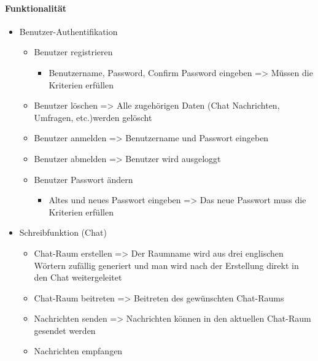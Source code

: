 \paragraph{Funktionalität}
\begin{itemize}
  \item Benutzer-Authentifikation
  \begin{itemize}
    \item Benutzer registrieren
    \begin{itemize}
      \item Benutzername, Password, Confirm Password eingeben
      \newline 
      => Müssen die Kriterien erfüllen
    \end{itemize}
    \item Benutzer löschen
    \newline
    => Alle zugehörigen Daten (Chat Nachrichten, Umfragen, etc.)werden gelöscht
    \item Benutzer anmelden
    \newline
    => Benutzername und Passwort eingeben
    \item Benutzer abmelden
    \newline
    => Benutzer wird ausgeloggt
    \item Benutzer Passwort ändern
    \begin{itemize}
      \item Altes und neues Passwort eingeben
      \newline
      => Das neue Passwort muss die Kriterien erfüllen
    \end{itemize}
  \end{itemize}
  \item Schreibfunktion (Chat)
    \begin{itemize}
      \item Chat-Raum erstellen
      \newline
      => Der Raumname wird aus drei englischen Wörtern zufällig generiert und man wird nach der Erstellung direkt in den Chat weitergeleitet
      \item Chat-Raum beitreten
      \newline
      => Beitreten des gewünschten Chat-Raums
      \item Nachrichten senden
      \newline
      => Nachrichten können in den aktuellen Chat-Raum gesendet werden
      \item Nachrichten empfangen
      \newline

\end{itemize}
\end{itemize}
